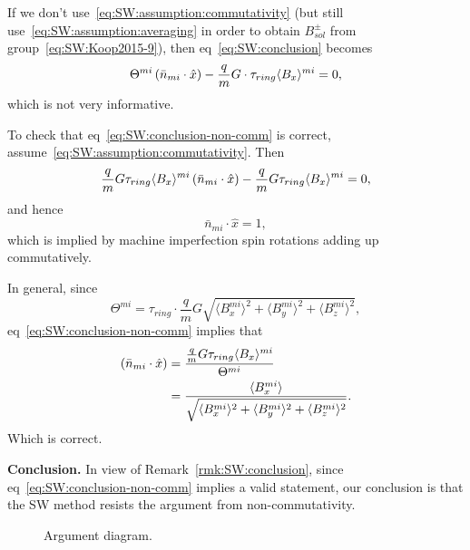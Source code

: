 \documentclass[12pt]{elsarticle}
\newcommand{\nbar}{\bar n}
\newcommand{\avg}[1]{\langle{#1}\rangle}
\newcommand{\tmi}{\Theta^{mi}}
\newcommand{\nbmi}{\nbar_{mi}}
\newcommand{\hx}{\hat x}
\newcommand{\tauR}{\tau_{ring}}
\begin{document}
\begin{rmk}
  If we don't use~\eqref{eq:SW:assumption:commutativity} (but still use~\eqref{eq:SW:assumption:averaging}
  in order to obtain $B_{sol}^\pm$ from group~\eqref{eq:SW:Koop2015-9}), then eq~\eqref{eq:SW:conclusion} becomes
  \begin{equation}\label{eq:SW:conclusion-non-comm}
    \tmi\bkt{\nbmi\cdot\hx} - \frac qmG\cdot\tauR\avg{B_x}^{mi} = 0,
  \end{equation}
  which is not very informative.
\end{rmk}

\begin{rmk}
  To check that eq~\eqref{eq:SW:conclusion-non-comm} is correct, assume~\eqref{eq:SW:assumption:commutativity}.
  Then
  \[
  \frac qmG\tauR\avg{B_x}^{mi}\bkt{\nbmi\cdot\hx} - \frac qmG\tauR\avg{B_x}^{mi}=0,
  \]
  and hence
  \[
  \nbmi\cdot\hx = 1,
  \]
  which is implied by machine imperfection spin rotations adding up commutatively.
\end{rmk}

\begin{rmk}\label{rmk:SW:conclusion}
  In general, since
  \[
  \tmi = \tauR\cdot \frac qmG\sqrt{\avg{B_x^{mi}}^2 + \avg{B_y^{mi}}^2 + \avg{B_z^{mi}}^2},
  \]
  eq~\eqref{eq:SW:conclusion-non-comm} implies that
  \begin{align}\label{eq:nbmi-expression-non-comm}
    (\nbmi\cdot\hx) &= \frac{\frac qmG\tauR\avg{B_x}^{mi}}{\tmi}\notag\\
    &= \frac{\avg{B_x^{mi}}}{\sqrt{\avg{B_x^{mi}}^2 + \avg{B_y^{mi}}^2 + \avg{B_z^{mi}}^2}}.
  \end{align}
  Which is correct.
\end{rmk}

\textbf{Conclusion.} In view of Remark~\ref{rmk:SW:conclusion}, since eq~\eqref{eq:SW:conclusion-non-comm}
implies a valid statement, our conclusion is that the SW method resists the argument from non-commutativity.

\begin{figure}\centering
  \caption{Argument diagram.}
\end{figure}
\end{document}

